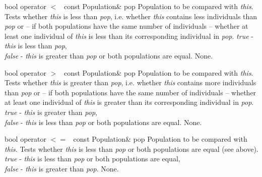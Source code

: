 \vspace*{4ex}

\setConstInstance
\printMethodWithOneParam
{bool}
{operator $<$\ }
{const Population\&}
{pop}
{Population to be compared with {\em this}.}
{Tests whether {\em this} is less than {\em pop}, i.e.
 whether {\em this} contains less individuals than {\em pop}
 or -- if both populations have the same number of individuals --
 whether at least one individual of {\em this} is less than
 its corresponding individual in {\em pop}.}
{{\em true} - {\em this} is less than {\em pop},\\
 {\em false} - {\em this} is greater than {\em pop} or both populations
 are equal.}
{None.}

\vspace*{4ex}

\setConstInstance
\printMethodWithOneParam
{bool}
{operator $>$\ }
{const Population\&}
{pop}
{Population to be compared with {\em this}.}
{Tests whether {\em this} is greater than {\em pop}, i.e.
 whether {\em this} contains more individuals than {\em pop}
 or -- if both populations have the same number of individuals --
 whether at least one individual of {\em this} is greater than
 its corresponding individual in {\em pop}.}
{{\em true} - {\em this} is greater than {\em pop},\\
 {\em false} - {\em this} is less than {\em pop} or both populations
are equal.}
{None.}

\clearpage

\setConstInstance
\printMethodWithOneParam
{bool}
{operator $<=$\ }
{const Population\&}
{pop}
{Population to be compared with {\em this}.}
{Tests whether {\em this} is less than {\em pop} or both
 populations are equal (see above).}
{{\em true} - {\em this} is less than {\em pop} or both populations are
 equal,\\
 {\em false} - {\em this} is greater than {\em pop}.}
{None.}

